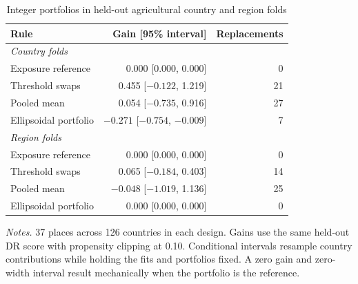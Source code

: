 \begin{table}[htbp]
\centering
\small
\caption{Integer portfolios in held-out agricultural country and region folds}
\label{tab:ellipsoid_application}
\begin{tabular}{lrr}
\toprule
Rule & Gain [95\% interval] & Replacements \\
\midrule
\multicolumn{3}{l}{\emph{Country folds}} \\
Exposure reference & 0.000 [0.000, 0.000] & 0 \\
Threshold swaps & 0.455 [$-0.122$, 1.219] & 21 \\
Pooled mean & 0.054 [$-0.735$, 0.916] & 27 \\
Ellipsoidal portfolio & $-0.271$ [$-0.754$, $-0.009$] & 7 \\
\midrule
\multicolumn{3}{l}{\emph{Region folds}} \\
Exposure reference & 0.000 [0.000, 0.000] & 0 \\
Threshold swaps & 0.065 [$-0.184$, 0.403] & 14 \\
Pooled mean & $-0.048$ [$-1.019$, 1.136] & 25 \\
Ellipsoidal portfolio & 0.000 [0.000, 0.000] & 0 \\
\bottomrule
\end{tabular}
\begin{minipage}{0.9\textwidth}\footnotesize\smallskip
\emph{Notes.} 37 places across 126 countries in each design. Gains use the same
held-out DR score with propensity clipping at 0.10. Conditional intervals resample
country contributions while holding the fits and portfolios fixed. A zero gain and
zero-width interval result mechanically when the portfolio is the reference.
\end{minipage}
\end{table}
